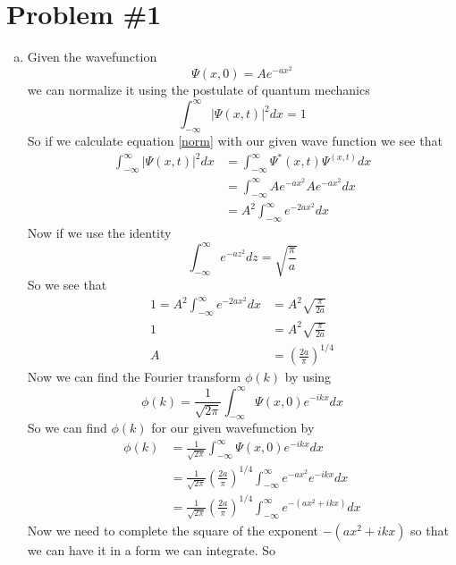 \documentclass[11pt]{article}
\numberwithin{equation}{section}
\begin{document}


\section{Problem \#1}
\begin{enumerate}[(a)]
\item
Given the wavefunction 
$$\Psi(x,0) = Ae^{-ax^2}$$
we can normalize it using the postulate of quantum mechanics 
\begin{equation}
\int_{-\infty}^{\infty}|\Psi(x,t)|^2dx = 1
\label{norm}
\end{equation}
So if we calculate equation \ref{norm} with our given wave function we see that
\begin{align*}
\int_{-\infty}^{\infty}|\Psi(x,t)|^2dx &=  \int_{-\infty}^{\infty}\Psi^*(x,t)\Psi^(x,t)dx \\
&=  \int_{-\infty}^{\infty}Ae^{-ax^2}Ae^{-ax^2}dx \\
&=  A^2\int_{-\infty}^{\infty}e^{-2ax^2}dx 
\end{align*}
Now if we use the identity 
\begin{equation}
\int_{-\infty}^{\infty}e^{-az^2}dz =  \sqrt{\frac{\pi}{a}}
\label{xsqint}
\end{equation}
So we see that 
\begin{align*}
1 = A^2\int_{-\infty}^{\infty}e^{-2ax^2}dx &=  A^2\sqrt{\frac{\pi}{2a}}\\
1 &=  A^2\sqrt{\frac{\pi}{2a}}\\
A &=  \left(\frac{2a}{\pi}\right)^{1/4}
\end{align*}
Now we can find the Fourier transform $\phi(k)$ by using
\begin{equation}
\phi(k) = \frac{1}{\sqrt{2\pi}}\int_{-\infty}^{\infty}\Psi(x,0)e^{-ikx}dx
\label{FourPhi}
\end{equation}
So we can find $\phi(k)$ for our given wavefunction by 
\begin{align*}
\phi(k) &= \frac{1}{\sqrt{2\pi}}\int_{-\infty}^{\infty}\Psi(x,0)e^{-ikx}dx\\
&= \frac{1}{\sqrt{2\pi}}\left(\frac{2a}{\pi}\right)^{1/4}\int_{-\infty}^{\infty}e^{-ax^2}e^{-ikx}dx\\
&= \frac{1}{\sqrt{2\pi}}\left(\frac{2a}{\pi}\right)^{1/4}\int_{-\infty}^{\infty}e^{-(ax^2+ikx)}dx
\end{align*}
Now we need to complete the square of the exponent $-(ax^2+ikx)$ so that we can have it in a form we can integrate. So
\begin{align*}

\end{align*}
\end{enumerate}
\end{document}
